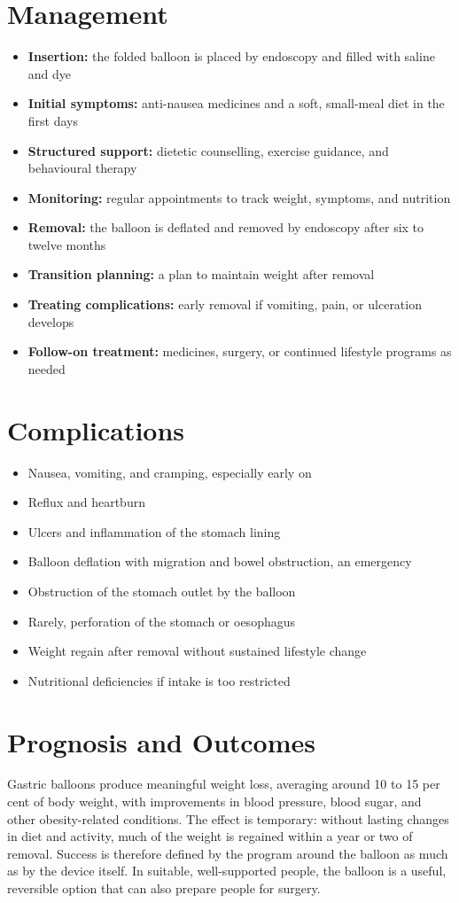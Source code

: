 \section*{Management}
\begin{itemize}
    \item \textbf{Insertion:} the folded balloon is placed by endoscopy and filled with saline and dye
    \item \textbf{Initial symptoms:} anti-nausea medicines and a soft, small-meal diet in the first days
    \item \textbf{Structured support:} dietetic counselling, exercise guidance, and behavioural therapy
    \item \textbf{Monitoring:} regular appointments to track weight, symptoms, and nutrition
    \item \textbf{Removal:} the balloon is deflated and removed by endoscopy after six to twelve months
    \item \textbf{Transition planning:} a plan to maintain weight after removal
    \item \textbf{Treating complications:} early removal if vomiting, pain, or ulceration develops
    \item \textbf{Follow-on treatment:} medicines, surgery, or continued lifestyle programs as needed
\end{itemize}

\section*{Complications}
\begin{itemize}
    \item Nausea, vomiting, and cramping, especially early on
    \item Reflux and heartburn
    \item Ulcers and inflammation of the stomach lining
    \item Balloon deflation with migration and bowel obstruction, an emergency
    \item Obstruction of the stomach outlet by the balloon
    \item Rarely, perforation of the stomach or oesophagus
    \item Weight regain after removal without sustained lifestyle change
    \item Nutritional deficiencies if intake is too restricted
\end{itemize}

\section*{Prognosis and Outcomes}
Gastric balloons produce meaningful weight loss, averaging around 10 to 15 per cent of body weight, with improvements in blood pressure, blood sugar, and other obesity-related conditions. The effect is temporary: without lasting changes in diet and activity, much of the weight is regained within a year or two of removal. Success is therefore defined by the program around the balloon as much as by the device itself. In suitable, well-supported people, the balloon is a useful, reversible option that can also prepare people for surgery.

